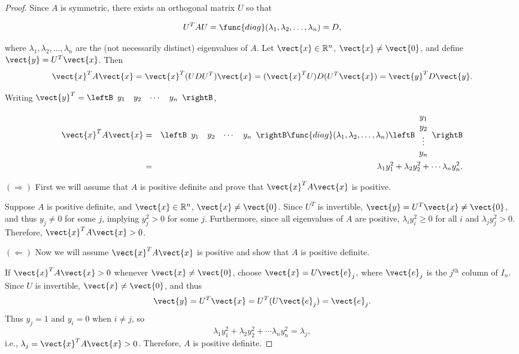 \begin{proof}
Since $A$ is symmetric, there exists an orthogonal matrix $U$ so that

\[ U^{T}AU=\func{diag}(\lambda_1,\lambda_2,\ldots,\lambda_n)=D,\]

where $\lambda_1,\lambda_2,\ldots,\lambda_n$ are the (not necessarily
distinct) eigenvalues of $A$.
Let $\vect{x}\in\mathbb{R}^n$, $\vect{x}\neq \vect{0}$, and define
$\vect{y}=U^T\vect{x}$.
Then
\[ \vect{x}^TA\vect{x}=\vect{x}^T(UDU^T)\vect{x}
= (\vect{x}^TU)D(U^T\vect{x})
=\vect{y}^TD\vect{y}.\]

Writing $\vect{y}^T=\leftB\begin{array}{cccc}
y_1 & y_2 & \cdots & y_n\end{array}\rightB$, 

\begin{eqnarray*}
\vect{x}^TA\vect{x} & = & 
\leftB\begin{array}{cccc} y_1 & y_2 & \cdots & y_n\end{array}\rightB
\func{diag}(\lambda_1,\lambda_2,\ldots,\lambda_n)
\leftB\begin{array}{c} y_1 \\ y_2 \\ \vdots \\ y_n\end{array}\rightB\\
& = & \lambda_1 y_1^2 + \lambda_2 y_2^2 + \cdots \lambda_n y_n^2.
\end{eqnarray*}

$(\Rightarrow)$ First we will assume that $A$ is positive definite and prove that $\vect{x}^T A \vect{x} $ is positive. 

Suppose $A$ is positive definite, and $\vect{x}\in\mathbb{R}^n$,
$\vect{x}\neq\vect{0}$.
Since $U^T$ is invertible, $\vect{y}=U^T\vect{x}\neq \vect{0}$,
and thus $y_j\neq 0$ for some $j$, implying $y_j^2>0$
for some $j$.
Furthermore, since all eigenvalues of $A$ are positive,
$\lambda_i y_i^2\geq 0$ for all $i$ and $\lambda_jy_j^2>0$.
Therefore, $\vect{x}^TA\vect{x}>0$.


$(\Leftarrow)$ Now we will assume $\vect{x}^T A \vect{x} $ is positive and show that $A$ is positive definite.

If $\vect{x}^TA\vect{x}>0$ whenever $\vect{x}\neq \vect{0}$,
choose $\vect{x}=U\vect{e}_j$, where $\vect{e}_j$ is the $j^{\mbox{th}}$
column of $I_n$.
Since $U$ is invertible, $\vect{x}\neq\vect{0}$, 
and thus
\[ \vect{y}=U^T\vect{x}=U^T(U\vect{e}_j) =\vect{e}_j.\]
Thus $y_j=1$ and $y_i=0$ when $i\neq j$, so
\[ \lambda_1 y_1^2 + \lambda_2 y_2^2 + \cdots \lambda_n y_n^2
=\lambda_j,\]
i.e., $\lambda_j=\vect{x}^TA\vect{x}>0$.
Therefore, $A$ is positive definite.
\end{proof}


